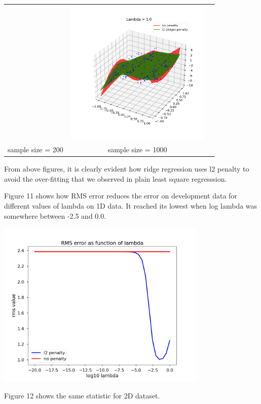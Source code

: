 \documentclass[11pt]{article}
\begin{document}
\begin{center}
\begin{tabular}{ccc}
    & \includegraphics[width=7cm]{regression/2d-ridge-ls-compare-27-200lnlam-0.0-fig.png}\\
    sample size = 200 & sample size = 1000 \\
    \end{tabular}
  \end{center}
From above figures, it is clearly evident how ridge regression uses l2 penalty to avoid the over-fitting that we observed in plain least square regresssion. 

Figure 11 shows how RMS error reduces the error on development data for different values of lambda on 1D data. It reached its lowest when log lambda was somewhere between -2.5 and 0.0.

\begin{center}
  \includegraphics[width=10cm]
  {regression/1d-rms-vs-lam-fig.png}
\end{center}

Figure 12 shows the same statistic for 2D dataset.
\end{document}
